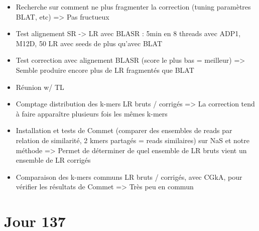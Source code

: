 \documentclass[12pt]{report}
\begin{document}
\begin{itemize}
	\item Recherche sur comment ne plus fragmenter la correction (tuning paramètres BLAT, etc) => Pas fructueux 
	
	\item Test alignement SR -> LR avec BLASR : 5min en 8 threads avec ADP1, M12D, 50 LR avec seeds de plus qu'avec BLAT
	
	\item Test correction avec alignement BLASR (score le plus bas = meilleur) => Semble produire encore plus de LR fragmentés que BLAT
	
	\item Réunion w/ TL
	
	\item Comptage distribution des k-mers LR bruts / corrigés => La correction tend à faire apparaître plusieurs fois les mêmes k-mers
	
	\item Installation et tests de Commet (comparer des ensembles de reads par relation de similarité, 2 kmers partagés = reads similaires)
		  sur NaS et notre méthode => Permet de déterminer de quel ensemble de LR bruts vient un ensemble de LR corrigés
		  
	\item Comparaison des k-mers communs LR bruts / corrigés, avec CGkA, pour vérifier les résultats de Commet => Très peu en commun
\end{itemize}

\section{Jour 137}
\end{document}
